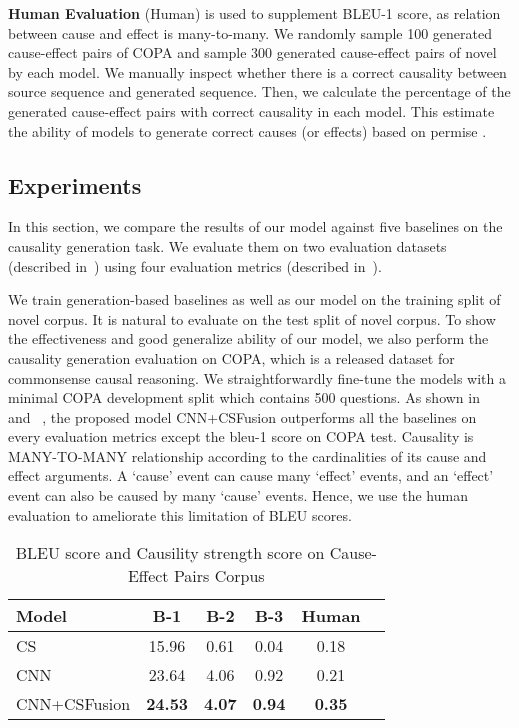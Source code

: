\textbf{Human Evaluation} (Human) is used to supplement
BLEU-1 score, as relation between cause and effect is many-to-many.
We randomly sample 100 generated cause-effect pairs of COPA
and sample 300 generated cause-effect pairs of novel
by each model.
We manually inspect whether there is a correct causality between source sequence
and generated sequence.
Then, we calculate the percentage of the generated 
cause-effect pairs with correct causality in each model.
This estimate the 
ability of models to generate correct causes (or effects) based on permise .

\subsection{Experiments}
\label{sec:exp}
In this section, we compare the results of our model
against five baselines on the causality generation task.
We evaluate them on two evaluation datasets (described in~) using four evaluation metrics
(described in~).

We train generation-based baselines as well as our model
on the training split of novel corpus.
It is natural to evaluate on the test split of novel corpus.
To show the effectiveness and good generalize ability of our model, we also perform the causality generation evaluation 
on COPA, which is a released dataset for commonsense causal reasoning.
We straightforwardly fine-tune the models with a minimal COPA development split which contains 500 questions.
As shown in ~ and ~, 
the proposed model CNN+CSFusion outperforms 
all the baselines on every evaluation metrics
except the bleu-1 score on COPA test.
Causality is MANY-TO-MANY relationship
according to the cardinalities of its cause and effect arguments.
A `cause' event can cause many `effect' events, and an `effect' event can also be caused by many `cause' events.
Hence, we use the human evaluation to 
ameliorate this limitation of BLEU scores.


\begin{table}[th]
	\centering
	\begin{tabular}{|l|c|c|c|c|c|}
		\hline
		Model &   B-1  & B-2 & B-3 & Human \\
		\hline
		CS  & 15.96 & 0.61 & 0.04 & 0.18 \\
		CNN & 23.64 & 4.06 & 0.92 & 0.21 \\
		\hline
		CNN+CSFusion & \bf 24.53 & \bf 4.07 & \bf 0.94 & \bf 0.35 \\
		\hline
	\end{tabular}
	\caption{BLEU score and Causility strength score on Cause-Effect Pairs Corpus}
	\label{tab:novel}
\end{table}

